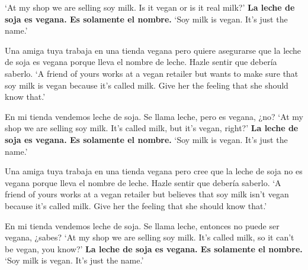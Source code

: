 \begin{exe}
\begin{xlist}[A:]
	\glt `At my shop we are selling soy milk. Is it vegan or is it real milk?' 
	 \textbf{La leche de soja es vegana. Es solamente el nombre.} 
	\glt `Soy milk is vegan. It's just the name.' 
	\end{xlist}
\ex \label{ex:experimentoOBVCONFvegana_APP}
	Una amiga tuya trabaja en una tienda vegana pero quiere asegurarse que la leche de soja es vegana porque lleva el nombre de leche. Hazle sentir que debería saberlo. 
	\glt `A friend of yours works at a vegan retailer but wants to make sure that soy milk is vegan because it's called milk. Give her the feeling that she should know that.' 
	\begin{xlist}[A:]
	 En mi tienda vendemos leche de soja. Se llama leche, pero es vegana, ¿no? \href{https://osf.io/4u3tc/}{\faVolumeUp} 
	\glt `At my shop we are selling soy milk. It's called milk, but it's vegan, right?' 
	 \textbf{La leche de soja es vegana. Es solamente el nombre.} 
	\glt `Soy milk is vegan. It's just the name.' 
	\end{xlist}
\ex \label{ex:experimentoOBVDENvegana_APP}
	Una amiga tuya trabaja en una tienda vegana pero cree que la leche de soja no es vegana porque lleva el nombre de leche. Hazle sentir que debería saberlo. 
	\glt `A friend of yours works at a vegan retailer but believes that soy milk isn't vegan because it's called milk. Give her the feeling that she should know that.' 
	\begin{xlist}[A:]
	 En mi tienda vendemos leche de soja. Se llama leche, entonces no puede ser vegana, ¿sabes? \href{https://osf.io/c9zym/}{\faVolumeUp} 
	\glt `At my shop we are selling soy milk. It's called milk, so it can't be vegan, you know?' 
	 \textbf{La leche de soja es vegana. Es solamente el nombre.} 
	\glt `Soy milk is vegan. It's just the name.'
	\end{xlist}
\end{exe}
